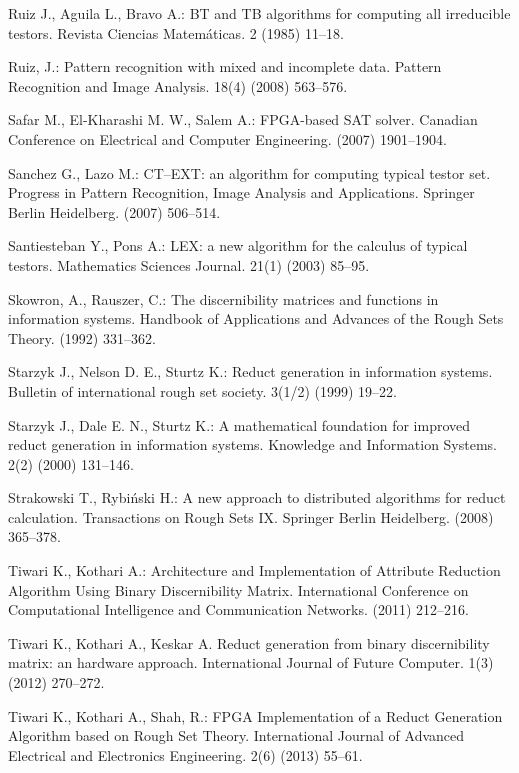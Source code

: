 \documentclass[11pt]{article}   %
\begin{document}
\begin{thebibliography}{}
	Ruiz J., Aguila L., Bravo A.:
	BT and TB algorithms for computing all irreducible testors. 
	Revista Ciencias Matem\'aticas. 2 (1985) 11--18.
	
	Ruiz, J.:
 	Pattern recognition with mixed and incomplete data. 
 	Pattern Recognition and Image Analysis. 18(4) (2008) 563--576.
 	
	Safar M., El-Kharashi M. W., Salem A.:
	FPGA-based SAT solver. 
	Canadian Conference on Electrical and Computer Engineering. (2007) 1901--1904. 
	
 	Sanchez G., Lazo M.:
 	CT--EXT: an algorithm for computing typical testor set.
 	Progress in Pattern Recognition, Image Analysis and Applications. 
 	Springer Berlin Heidelberg. (2007) 506--514.
 
	Santiesteban Y., Pons A.:
	LEX: a new algorithm for the calculus of typical testors.
	Mathematics Sciences Journal. 21(1) (2003) 85--95.
	
	Skowron, A., Rauszer, C.:
	The discernibility matrices and functions in information systems. 
	Handbook of Applications and Advances of the Rough Sets Theory. (1992) 331--362.

	Starzyk J., Nelson D. E., Sturtz K.:
	Reduct generation in information systems.
	Bulletin of international rough set society. 3(1/2) (1999) 19--22.

	Starzyk J., Dale E. N., Sturtz K.:
	A mathematical foundation for improved reduct generation in information systems.
	Knowledge and Information Systems. 2(2) (2000) 131--146.

	Strakowski T.,  Rybi\'nski H.:
	A new approach to distributed algorithms for reduct calculation.
	Transactions on Rough Sets IX. Springer Berlin Heidelberg. (2008) 365--378.

	Tiwari K., Kothari A.:
	Architecture and Implementation of Attribute Reduction Algorithm Using Binary Discernibility Matrix.
	International Conference on Computational Intelligence and Communication Networks. (2011) 212--216.

	Tiwari K., Kothari A., Keskar A.  
	Reduct generation from binary discernibility matrix: an hardware approach. 
	International Journal of Future Computer. 1(3) (2012) 270--272.

	Tiwari K., Kothari A., Shah, R.:
	FPGA Implementation of a Reduct Generation Algorithm based on Rough Set Theory. 
	International Journal of Advanced Electrical and Electronics Engineering. 2(6) (2013) 55--61.


\end{thebibliography}
\end{document}
